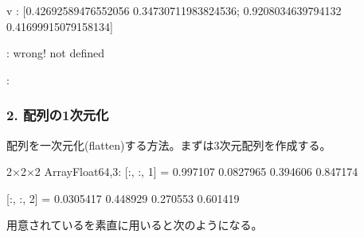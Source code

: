 \documentclass[letterpaper,10pt,english]{sphinxmanual}
\begin{document}
\begin{sphinxVerbatim}[commandchars=\\\{\}]
v : [0.42692589476552056 0.34730711983824536; 0.9208034639794132 0.41699915079158134]
\end{sphinxVerbatim}

\begin{sphinxVerbatim}[commandchars=\\\{\}]
: wrong! not defined

:
 \PYG{p}{[}\PYG{p}{]}    \PYG{p}{[}\PYG{p}{]}
 \PYG{p}{[}\PYG{p}{]}      \PYGZbs{}
\end{sphinxVerbatim}


\subsubsection{2. 配列の1次元化}
\label{\detokenize{tips:id2}}
配列を一次元化(flatten)する方法。まずは3次元配列を作成する。

\begin{sphinxVerbatim}[commandchars=\\\{\}]
    
\end{sphinxVerbatim}

\begin{sphinxVerbatim}[commandchars=\\\{\}]
2×2×2 Array\PYGZob{}Float64,3\PYGZcb{}:
[:, :, 1] =
 0.997107  0.0827965
 0.394606  0.847174

[:, :, 2] =
 0.0305417  0.448929
 0.270553   0.601419
\end{sphinxVerbatim}

用意されているを素直に用いると次のようになる。

\begin{sphinxVerbatim}[commandchars=\\\{\}]
  
\end{sphinxVerbatim}
\end{document}
